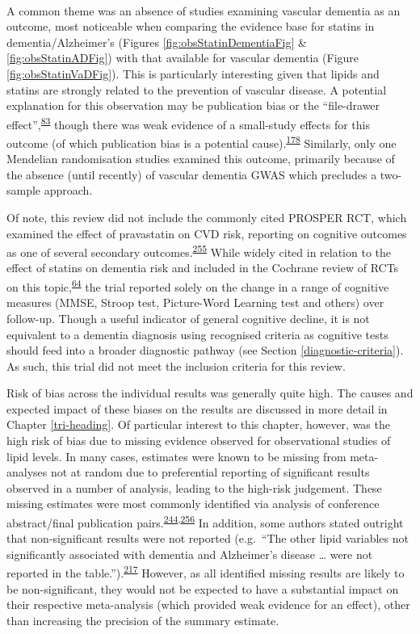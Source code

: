 \documentclass[a4paper, twoside]{templates/ociamthesis}
\begin{document}
~

A common theme was an absence of studies examining vascular dementia as an outcome, most noticeable when comparing the evidence base for statins in dementia/Alzheimer's (Figures \ref{fig:obsStatinDementiaFig} \& \ref{fig:obsStatinADFig}) with that available for vascular dementia (Figure \ref{fig:obsStatinVaDFig}). This is particularly interesting given that lipids and statins are strongly related to the prevention of vascular disease. A potential explanation for this observation may be publication bias or the ``file-drawer effect'',\textsuperscript{\protect\hyperlink{ref-rosenthal1979}{83}} though there was weak evidence of a small-study effects for this outcome (of which publication bias is a potential cause).\textsuperscript{\protect\hyperlink{ref-sterne2011}{178}} Similarly, only one Mendelian randomisation studies examined this outcome, primarily because of the absence (until recently) of vascular dementia GWAS which precludes a two-sample approach.

Of note, this review did not include the commonly cited PROSPER RCT, which examined the effect of pravastatin on CVD risk, reporting on cognitive outcomes as one of several secondary outcomes.\textsuperscript{\protect\hyperlink{ref-shepherd2002}{255}} While widely cited in relation to the effect of statins on dementia risk and included in the Cochrane review of RCTs on this topic,\textsuperscript{\protect\hyperlink{ref-mcguinness2016}{64}} the trial reported solely on the change in a range of cognitive measures (MMSE, Stroop test, Picture-Word Learning test and others) over follow-up. Though a useful indicator of general cognitive decline, it is not equivalent to a dementia diagnosis using recognised criteria as cognitive tests should feed into a broader diagnostic pathway (see Section \ref{diagnostic-criteria}). As such, this trial did not meet the inclusion criteria for this review.

Risk of bias across the individual results was generally quite high. The causes and expected impact of these biases on the results are discussed in more detail in Chapter \ref{tri-heading}. Of particular interest to this chapter, however, was the high risk of bias due to missing evidence observed for observational studies of lipid levels. In many cases, estimates were known to be missing from meta-analyses not at random due to preferential reporting of significant results observed in a number of analysis, leading to the high-risk judgement. These missing estimates were most commonly identified via analysis of conference abstract/final publication pairs.\textsuperscript{\protect\hyperlink{ref-yamada2009}{244},\protect\hyperlink{ref-yamada2009conf}{256}} In addition, some authors stated outright that non-significant results were not reported (e.g.~``The other lipid variables not significantly associated with dementia and Alzheimer's disease \ldots{} were not reported in the table.'').\textsuperscript{\protect\hyperlink{ref-ancelin2013}{217}} However, as all identified missing results are likely to be non-significant, they would not be expected to have a substantial impact on their respective meta-analysis (which provided weak evidence for an effect), other than increasing the precision of the summary estimate.
\end{document}
